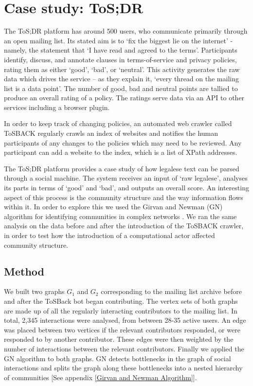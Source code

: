 \documentclass{sig-alternate}
\begin{document}
\section{Case study: ToS;DR}

The ToS;DR platform has around 500 users, who communicate primarily through an open mailing list. Its stated aim is to `fix the biggest lie on the internet' - namely, the statement that `I have read and agreed to the terms'. Participants identify, discuss, and annotate clauses in terms-of-service and privacy policies, rating them as either `good', `bad', or `neutral'. This activity generates the raw data which drives the service – as they explain it, `every thread on the mailing list is a data point'. The number of good, bad and neutral points are tallied to produce an overall rating of a policy. The ratings serve data via an API to other services including a browser plugin.

In order to keep track of changing policies, an automated web crawler called ToSBACK regularly crawls an index of websites and notifies the human participants of any changes to the policies which may need to be reviewed. Any participant can add a website to the index, which is a list of XPath addresses.

The ToS;DR platform provides a case study of how legalese text can be parsed through a social machine. The system receives an input of `raw legalese', analyses its parts in terms of `good' and `bad', and outputs an overall score. An interesting aspect of this process is the community structure and the way information flows within it. In order to explore this we used the Girvan and Newman (GN) algorithm for identifying communities in complex networks \cite{gnm:comm}. We ran the same analysis on the data before and after the introduction of the ToSBACK crawler, in order to test how the introduction of a computational actor affected community structure.

\subsection{Method}

We built two graphs $G_{1}$ and $G_2$ corresponding to the mailing list archive before and after the ToSBack bot began contributing. The vertex sets of both graphs are made up of all the regularly interacting contributors to the mailing list. In total, 2,345 interactions were analysed, from between 28-35 active users. An edge was placed between two vertices if the relevant contributors responded, or were responded to by another contributor. These edges were then weighted by the number of interactions between the relevant contributors. Finally we applied the GN algorithm to both graphs. GN detects bottlenecks in the graph of social interactions and splits the graph along these bottlenecks into  a nested hierarchy of communities [See appendix \ref{Girvan and Newman Algorithm}].
\end{document}
